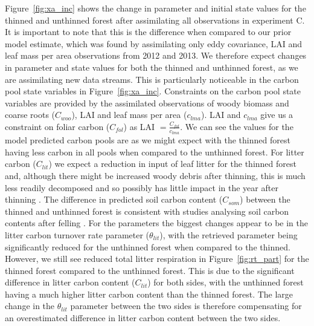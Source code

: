 Figure~\ref{fig:xa_inc} shows the change in parameter and initial state values for the thinned and unthinned forest after assimilating all observations in experiment C. It is important to note that this is the difference when compared to our prior model estimate, which was found by assimilating only eddy covariance, LAI and leaf mass per area observations from 2012 and 2013. We therefore expect changes in parameter and state values for both the thinned and unthinned forest, as we are assimilating new data streams. This is particularly noticeable in the carbon pool state variables in Figure~\ref{fig:xa_inc}. Constraints on the carbon pool state variables are provided by the assimilated observations of woody biomass and coarse roots (\(C_{woo}\)), LAI and leaf mass per area (\(c_{lma}\)). LAI and \(c_{lma}\) give us a constraint on foliar carbon (\(C_{fol}\)) as LAI \(= \frac{C_{fol}}{c_{lma}} \). We can see the values for the model predicted carbon pools are as we might expect with the thinned forest having less carbon in all pools when compared to the unthinned forest. For litter carbon (\(C_{lit}\)) we expect a reduction in input of leaf litter for the thinned forest and, although there might be increased woody debris after thinning, this is much less readily decomposed and so possibly has little impact in the year after thinning \citep{wilkinson2016}. The difference in predicted soil carbon content (\(C_{som}\)) between the thinned and unthinned forest is consistent with studies analysing soil carbon contents after felling \citep{Hernesmaa2005777}. For the parameters the biggest changes appear to be in the litter carbon turnover rate parameter (\(\theta_{lit}\)), with the retrieved parameter being significantly reduced for the unthinned forest when compared to the thinned. However, we still see reduced total litter respiration in Figure~\ref{fig:rt_part} for the thinned forest compared to the unthinned forest. This is due to the significant difference in litter carbon content (\(C_{lit}\)) for both sides, with the unthinned forest having a much higher litter carbon content than the thinned forest. The large change in the \(\theta_{lit}\) parameter between the two sides is therefore compensating for an overestimated difference in litter carbon content between the two sides.    
 \clearpage
 
 
